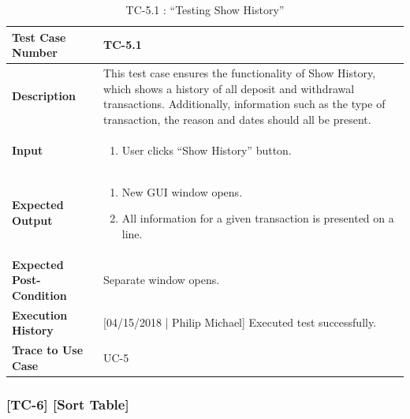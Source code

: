 \documentclass[12pt]{article}
\begin{document}
\begin{table}[H]
\caption{TC-5.1 : “Testing Show History”}
\begin{center}
\begin{tabular}{|p{5.5	cm}|p{11cm}|}
\hline
\bf Test Case Number & TC-5.1\\
\hline
\bf Description & This test case ensures the functionality of Show History, which shows a history of all deposit and withdrawal transactions. Additionally, information such as the type of transaction, the reason and dates should all be present.\\
\hline
\bf Input &
\begin{enumerate}
\item User clicks ``Show History'' button.
\end{enumerate}
\\
\hline
\bf Expected Output &
\begin{enumerate}
\item New GUI window opens.
\item All information for a given transaction is presented on a line.
\end{enumerate}
\\
\hline
\bf Expected Post-Condition & Separate window opens.\\\hline
\bf Execution History & [04/15/2018 | Philip Michael] Executed test successfully.\\\hline
\bf Trace to Use Case & UC-5 \\

\hline
\end{tabular}
\end{center}
\end{table}

\subsubsection{[TC-6] [Sort Table]} \label{tc:6}
\end{document}
